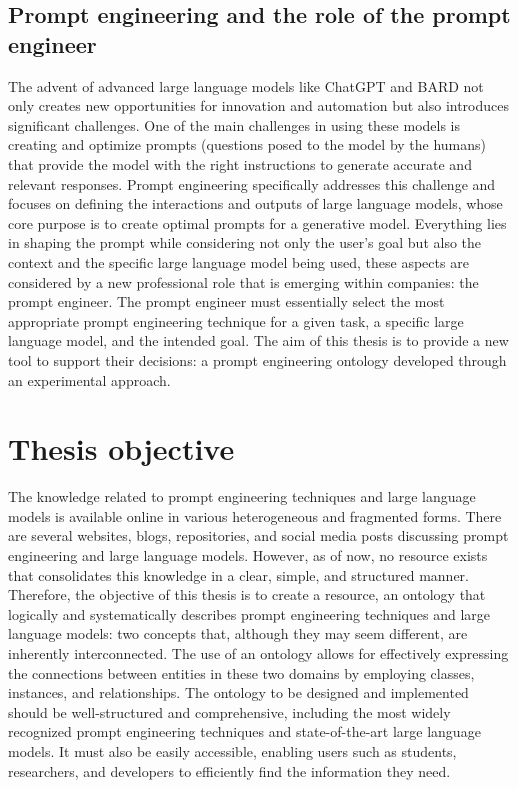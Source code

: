 \subsection{Prompt engineering and the role of the prompt engineer}
The advent of advanced large language models like ChatGPT and BARD not only creates new opportunities for innovation and automation but also introduces significant challenges. One of the main challenges in using these models is creating and optimize prompts (questions posed to the model by the humans) \cite{ref5} that provide the model with the right instructions to generate accurate and relevant responses. Prompt engineering specifically addresses this challenge and focuses on defining the interactions and outputs of large language models, whose core purpose is to create optimal prompts for a generative model.\cite{amatriain2024prompt}
Everything lies in shaping the prompt while considering not only the user’s goal but also the context and the specific large language model being used, these aspects are considered by a new professional role that is emerging within companies: the prompt engineer. The prompt engineer must essentially select the most appropriate prompt engineering technique for a given task, a specific large language model, and the intended goal. The aim of this thesis is to provide a new tool to support their decisions: a prompt engineering ontology developed through an experimental approach.


\section{Thesis objective}
The knowledge related to prompt engineering techniques and large language models is available online in various heterogeneous and fragmented forms. There are several websites, blogs, repositories, and social media posts discussing prompt engineering and large language models. However, as of now, no resource exists that consolidates this knowledge in a clear, simple, and structured manner. Therefore, the objective of this thesis is to create a resource, an ontology that logically and systematically describes prompt engineering techniques and large language models: two concepts that, although they may seem different, are inherently interconnected. The use of an ontology allows for effectively expressing the connections between entities in these two domains by employing classes, instances, and relationships.
The ontology to be designed and implemented should be well-structured and comprehensive, including the most widely recognized prompt engineering techniques and state-of-the-art large language models. It must also be easily accessible, enabling users such as students, researchers, and developers to efficiently find the information they need.

